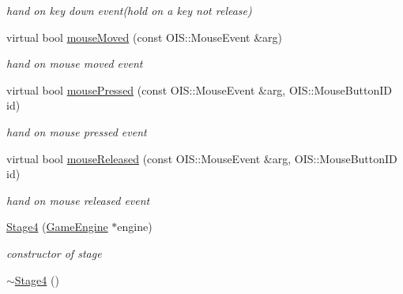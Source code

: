\begin{DoxyCompactItemize}
\begin{DoxyCompactList}\small\item\em hand on key down event(hold on a key not release) \end{DoxyCompactList}\item 
\hypertarget{class_stage4_a2fa8f237e2fd48cb54c21688d431e9ac}{
virtual bool \hyperlink{class_stage4_a2fa8f237e2fd48cb54c21688d431e9ac}{mouseMoved} (const OIS::MouseEvent \&arg)}
\label{class_stage4_a2fa8f237e2fd48cb54c21688d431e9ac}

\begin{DoxyCompactList}\small\item\em hand on mouse moved event \end{DoxyCompactList}\item 
\hypertarget{class_stage4_ae1a84f47aab629100a7b2e2d472994ee}{
virtual bool \hyperlink{class_stage4_ae1a84f47aab629100a7b2e2d472994ee}{mousePressed} (const OIS::MouseEvent \&arg, OIS::MouseButtonID id)}
\label{class_stage4_ae1a84f47aab629100a7b2e2d472994ee}

\begin{DoxyCompactList}\small\item\em hand on mouse pressed event \end{DoxyCompactList}\item 
\hypertarget{class_stage4_aafd48865862760c9e7be27b0521bb939}{
virtual bool \hyperlink{class_stage4_aafd48865862760c9e7be27b0521bb939}{mouseReleased} (const OIS::MouseEvent \&arg, OIS::MouseButtonID id)}
\label{class_stage4_aafd48865862760c9e7be27b0521bb939}

\begin{DoxyCompactList}\small\item\em hand on mouse released event \end{DoxyCompactList}\item 
\hypertarget{class_stage4_a88fc6e35397f5afa492966c680d7dab3}{
\hyperlink{class_stage4_a88fc6e35397f5afa492966c680d7dab3}{Stage4} (\hyperlink{class_game_engine}{GameEngine} $\ast$engine)}
\label{class_stage4_a88fc6e35397f5afa492966c680d7dab3}

\begin{DoxyCompactList}\small\item\em constructor of stage \end{DoxyCompactList}\item 
\hypertarget{class_stage4_ab6142f23e433260d6bc88f353e52e0cc}{
\hyperlink{class_stage4_ab6142f23e433260d6bc88f353e52e0cc}{$\sim$Stage4} ()}
\label{class_stage4_ab6142f23e433260d6bc88f353e52e0cc}


\end{DoxyCompactItemize}
